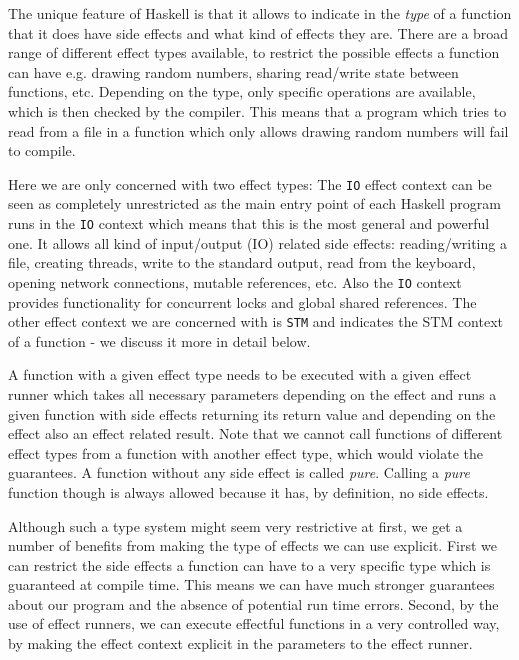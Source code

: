 The unique feature of Haskell is that it allows to indicate in the \textit{type} of a function that it does have side effects and what kind of effects they are. There are a broad range of different effect types available, to restrict the possible effects a function can have e.g. drawing random numbers, sharing read/write state between functions, etc. Depending on the type, only specific operations are available, which is then checked by the compiler. This means that a program which tries to read from a file in a function which only allows drawing random numbers will fail to compile.

Here we are only concerned with two effect types: The \texttt{IO} effect context can be seen as completely unrestricted as the main entry point of each Haskell program runs in the \texttt{IO} context which means that this is the most general and powerful one. It allows all kind of input/output (IO) related side effects: reading/writing a file, creating threads, write to the standard output, read from the keyboard, opening network connections, mutable references, etc. Also the \texttt{IO} context provides functionality for concurrent locks and global shared references. The other effect context we are concerned with is \texttt{STM} and indicates the STM context of a function - we discuss it more in detail below. 

A function with a given effect type needs to be executed with a given effect runner which takes all necessary parameters depending on the effect and runs a given function with side effects returning its return value and depending on the effect also an effect related result. Note that we cannot call functions of different effect types from a function with another effect type, which would violate the guarantees. A function without any side effect is called \textit{pure}. Calling a \textit{pure} function though is always allowed because it has, by definition, no side effects. 

Although such a type system might seem very restrictive at first, we get a number of benefits from making the type of effects we can use explicit. First we can restrict the side effects a function can have to a very specific type which is guaranteed at compile time. This means we can have much stronger guarantees about our program and the absence of potential run time errors. Second, by the use of effect runners, we can execute effectful functions in a very controlled way, by making the effect context explicit in the parameters to the effect runner.

